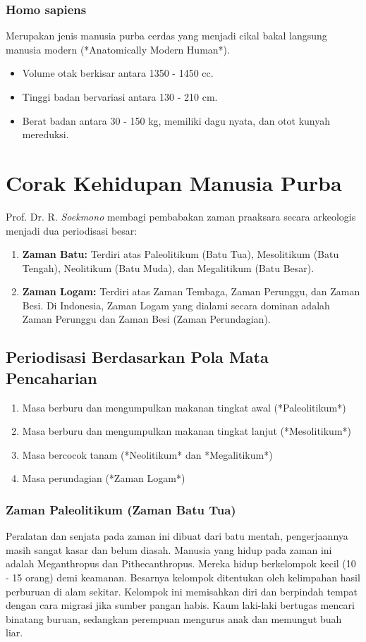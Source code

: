 \documentclass[12pt, a4paper]{article}
\begin{document}
\subsubsection{Homo sapiens}
Merupakan jenis manusia purba cerdas yang menjadi cikal bakal langsung manusia modern (*Anatomically Modern Human*).
\begin{itemize}
	\item Volume otak berkisar antara 1350 - 1450 cc.
	\item Tinggi badan bervariasi antara 130 - 210 cm.
	\item Berat badan antara 30 - 150 kg, memiliki dagu nyata, dan otot kunyah mereduksi.
\end{itemize}

\section{Corak Kehidupan Manusia Purba}
Prof. Dr. R. \textit{Soekmono} membagi pembabakan zaman praaksara secara arkeologis menjadi dua periodisasi besar:
\begin{enumerate}
	\item \textbf{Zaman Batu:} Terdiri atas Paleolitikum (Batu Tua), Mesolitikum (Batu Tengah), Neolitikum (Batu Muda), dan Megalitikum (Batu Besar).
	\item \textbf{Zaman Logam:} Terdiri atas Zaman Tembaga, Zaman Perunggu, dan Zaman Besi. Di Indonesia, Zaman Logam yang dialami secara dominan adalah Zaman Perunggu dan Zaman Besi (Zaman Perundagian).
\end{enumerate}

\subsection{Periodisasi Berdasarkan Pola Mata Pencaharian}
\begin{enumerate}
	\item Masa berburu dan mengumpulkan makanan tingkat awal (*Paleolitikum*)
	\item Masa berburu dan mengumpulkan makanan tingkat lanjut (*Mesolitikum*)
	\item Masa bercocok tanam (*Neolitikum* dan *Megalitikum*)
	\item Masa perundagian (*Zaman Logam*)
\end{enumerate}

\subsubsection{Zaman Paleolitikum (Zaman Batu Tua)}
Peralatan dan senjata pada zaman ini dibuat dari batu mentah, pengerjaannya masih sangat kasar dan belum diasah. Manusia yang hidup pada zaman ini adalah Meganthropus dan Pithecanthropus. 
Mereka hidup berkelompok kecil (10 - 15 orang) demi keamanan. Besarnya kelompok ditentukan oleh kelimpahan hasil perburuan di alam sekitar. Kelompok ini memisahkan diri dan berpindah tempat dengan cara migrasi jika sumber pangan habis. Kaum laki-laki bertugas mencari binatang buruan, sedangkan perempuan mengurus anak dan memungut buah liar.
\end{document}
